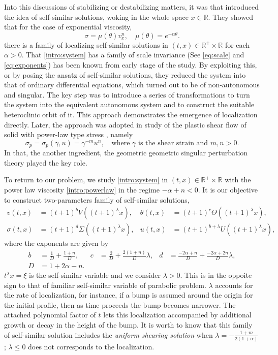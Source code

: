 \documentclass[a4paper,11pt]{article}
\begin{document}
Into this discussions of stabilizing or destabilizing matters, it was \cite{KOT14} that introduced the idea of self-similar solutions, woking in the whole space $x\in \mathbb{R}$. They showed that for the case of exponential viscosity, 
$$ \sigma = \mu(\theta)v_x^n, \quad \mu(\theta) = e^{-\alpha\theta}.$$
there is a family of localizing self-similar solutions in $(t,x) \in \mathbb{R}^+ \times \mathbb{R}$ for each $\alpha>0.$
That \eqref{intro:system} has a family of scale invariance (See \eqref{eq:scale} and \eqref{eq:exponents}) has been known from early stage of the study. By exploiting this, or by posing the ansatz of self-similar solutions, they reduced the system into that of ordinary differential equations, which turned out to be of non-autonomous and singular. The key step was to introduce a series of transformations to turn the system into the equivalent autonomous system and to  construct the suitable heteroclinic orbit of it. This approach demonstrates the emergence of localization directly. Later, the approach was adopted in study of the plastic shear flow of solid with power-law type stress \cite{KLT_2016, LT16}, namely
$$ \sigma_p = \sigma_p(\gamma,u) = \gamma^{-m}u^n, \quad \text{where $\gamma$ is the shear strain and $m,n>0$.}$$
In that, the another ingredient, the geometric geometric singular perturbation theory played the key role. 

To return to our problem, we study \eqref{intro:system} in $(t,x) \in \mathbb{R}^+ \times \mathbb{R}$ with the power law viscosity \eqref{intro:powerlaw} in the regime $-\alpha+n<0$. 
It is our objective to construct two-parameters family of self-similar solutions,
\begin{equation*}
\begin{aligned}
 v(t,x) &= (t+1)^b V((t+1)^\lambda x), &\theta(t,x) &= (t+1)^c \Theta((t+1)^\lambda x),\\
 \sigma(t,x) &= (t+1)^d \Sigma((t+1)^\lambda x), & u(t,x) &= (t+1)^{b+\lambda} U((t+1)^\lambda x),
\end{aligned}
\end{equation*}
where the exponents are given by
\begin{equation} \label{intro:exponents}
\begin{aligned}
 b&=\frac{1}{D} + \frac{1+n}{D}, & c&=\frac{2}{D} + \frac{2(1+n)}{D}\lambda, & d&=\frac{-2\alpha +n}{D} + \frac{-2\alpha+2n}{D}\lambda,\\
 D&=1+2\alpha-n.
\end{aligned}
\end{equation}
$t^\lambda x=\xi$ is the self-similar variable and we consider $\lambda>0$. This is in the oppoite sign to that of familiar self-similar variable of parabolic problem. $\lambda$ accounts for the rate of localization, for instance, if a bump is assumed around the origin for the initial profile, then as time proceeds the bump becomes narrower. The attached polynomial factor of $t$ lets this localization accompanied by additional growth or decay in the height of the bump. It is worth to know that this family of self-similar solution includes the {\it uniform shearing solution} when $\lambda = -\frac{1+m}{2(1+\alpha)}$; $\lambda \le0$ does not corresponds to the localization.
\end{document}
